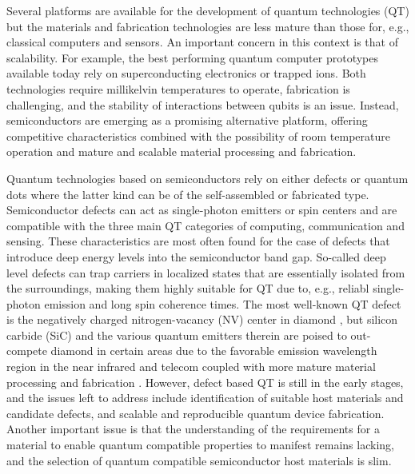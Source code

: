 \documentclass[superscriptaddress,unsortedaddress,
 amsmath,amssymb,
 aps,
]{revtex4-2}
\begin{document}
Several platforms are available for the development of quantum technologies (QT) but the materials and fabrication technologies are less mature than those for, e.g., classical computers and sensors. 
An important concern in this context is that of scalability. 
For example, the best performing quantum computer prototypes available today rely on superconducting electronics or trapped ions. Both technologies require millikelvin temperatures to operate, fabrication is challenging, and the stability of interactions between qubits is an issue. Instead, semiconductors are emerging as a promising alternative platform, offering competitive characteristics combined with the possibility of room temperature operation and mature and scalable material processing and fabrication.  

Quantum technologies based on semiconductors rely on either defects or quantum dots where the latter kind can be of the self-assembled or fabricated type. 
Semiconductor defects can act as single-photon emitters or spin centers and are compatible with the three main QT categories of computing, communication and sensing.  
These characteristics are most often found for the case of defects that introduce deep energy levels into the semiconductor band gap. So-called deep level defects can trap carriers in localized states that are essentially isolated from the surroundings, making them highly suitable for QT due to, e.g., reliabl single-photon emission and long spin coherence times. 
The most well-known QT defect is the negatively charged nitrogen-vacancy (NV) center in diamond \cite{Doherty_2013}, but silicon carbide (SiC) and the various quantum emitters therein are poised to out-compete diamond in certain areas due to the favorable emission wavelength region in the near infrared and telecom coupled with more mature material processing and fabrication  \cite{Bathen2021}. 
However, defect based QT is still in the early stages, and the issues left to address include identification of suitable host materials and candidate defects, and scalable and reproducible quantum device fabrication. Another important issue is that the understanding of the requirements for a material to enable quantum compatible properties to manifest remains lacking,  
and the selection of quantum compatible semiconductor host materials is slim. 
\end{document}
